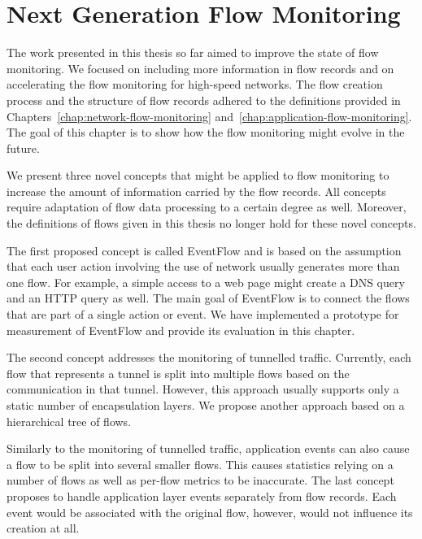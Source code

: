 \chapter{Next Generation Flow Monitoring}\label{chap:next-generation-flow}

\begin{chapintro}

The work presented in this thesis so far aimed to improve the state of flow monitoring. We focused on including more information in flow records and on accelerating the flow monitoring for high-speed networks. The flow creation process and the structure of flow records adhered to the definitions provided in Chapters~\ref{chap:network-flow-monitoring} and~\ref{chap:application-flow-monitoring}. The goal of this chapter is to show how the flow monitoring might evolve in the future.

We present three novel concepts that might be applied to flow monitoring to increase the amount of information carried by the flow records. All concepts require adaptation of flow data processing to a certain degree as well. Moreover, the definitions of flows given in this thesis no longer hold for these novel concepts.

The first proposed concept is called EventFlow and is based on the assumption that each user action involving the use of network usually generates more than one flow. For example, a simple access to a web page might create a DNS query and an HTTP query as well. The main goal of EventFlow is to connect the flows that are part of a single action or event. We have implemented a prototype for measurement of EventFlow and provide its evaluation in this chapter.

The second concept addresses the monitoring of tunnelled traffic. Currently, each flow that represents a tunnel is split into multiple flows based on the communication in that tunnel. However, this approach usually supports only a static number of encapsulation layers. We propose another approach based on a hierarchical tree of flows.

Similarly to the monitoring of tunnelled traffic, application events can also cause a flow to be split into several smaller flows. This causes statistics relying on a number of flows as well as per-flow metrics to be inaccurate. The last concept proposes to handle application layer events separately from flow records. Each event would be associated with the original flow, however, would not influence its creation at all.


\end{chapintro}
